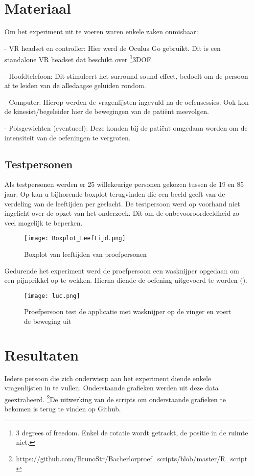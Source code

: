 \section{Materiaal}
Om het experiment uit te voeren waren enkele zaken onmisbaar:

- VR headset en controller: Hier werd de Oculus Go gebruikt. Dit is een standalone VR headset dat beschikt over \footnote{3 degrees of freedom. Enkel de rotatie wordt getrackt, de positie in de ruimte niet.}3DOF.

- Hoofdtelefoon: Dit stimuleert het surround sound effect, bedoelt om de persoon af te leiden van de alledaagse geluiden rondom.

- Computer: Hierop werden de vragenlijsten ingevuld na de oefensessies. Ook kon de kinesist/begeleider hier de bewegingen van de patiënt meevolgen.

- Polsgewichten (eventueel): Deze konden bij de patiënt omgedaan worden om de intensiteit van de oefeningen te vergroten.

\newpage
\subsection{Testpersonen}
Als testpersonen werden er 25 willekeurige personen gekozen tussen de 19 en 85 jaar. Op \cite{figuur 6.1} kan u bijhorende boxplot terugvinden die een beeld geeft van de verdeling van de leeftijden per geslacht. De testpersoon werd op voorhand niet ingelicht over de opzet van het onderzoek. Dit om de onbevooroordeeldheid zo veel mogelijk te beperken.

\begin{figure}[h]
    \centering
    \texttt{[image: Boxplot\_Leeftijd.png]}
    \caption{Boxplot van leeftijden van proefpersonen}
    \label{figuur 6.1}
\end{figure}

Gedurende het experiment werd de proefpersoon een wasknijper opgedaan om een pijnprikkel op te wekken. Hierna diende de oefening uitgevoerd te worden (\cite{figuur 6.2}). 

\begin{figure}[h]
    \centering
    \texttt{[image: luc.png]}
    \caption{Proefpersoon test de applicatie met wasknijper op de vinger en voert de beweging uit}
    \label{figuur 6.2}
\end{figure}

\newpage

\section{Resultaten}
Iedere persoon die zich onderwierp aan het experiment diende enkele vragenlijsten in te vullen. Onderstaande grafieken werden uit deze data geëxtraheerd.
\footnote{https://github.com/BrunoStr/Bacherlorproef\_scripts/blob/master/R\_script}De uitwerking van de scripts om onderstaande grafieken te bekomen is terug te vinden op Github.

